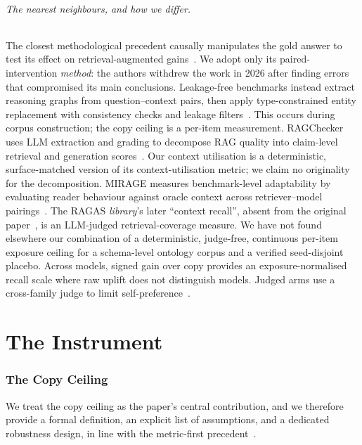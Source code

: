 \documentclass[10pt,twocolumn]{article}
\begin{document}
\paragraph{The nearest neighbours, and how we differ.}
The closest methodological precedent causally manipulates the gold answer to test its effect on retrieval-augmented gains~\cite{answerpresence2026}. We adopt only its paired-intervention \emph{method}: the authors withdrew the work in 2026 after finding errors that compromised its main conclusions. Leakage-free benchmarks instead extract reasoning graphs from question--context pairs, then apply type-constrained entity replacement with consistency checks and leakage filters~\cite{seedrg2026}. This occurs during corpus construction; the copy ceiling is a per-item measurement. RAGChecker uses LLM extraction and grading to decompose RAG quality into claim-level retrieval and generation scores~\cite{ragchecker2024}. Our context utilisation is a deterministic, surface-matched version of its context-utilisation metric; we claim no originality for the decomposition. MIRAGE measures benchmark-level adaptability by evaluating reader behaviour against oracle context across retriever--model pairings~\cite{mirage2025}. The RAGAS \emph{library}'s later ``context recall'', absent from the original paper~\cite{es2023ragas}, is an LLM-judged retrieval-coverage measure. We have not found elsewhere our combination of a deterministic, judge-free, continuous per-item exposure ceiling for a schema-level ontology corpus and a verified seed-disjoint placebo. Across models, signed gain over copy provides an exposure-normalised recall scale where raw uplift does not distinguish models. Judged arms use a cross-family judge to limit self-preference~\cite{zheng2023judging,panickssery2024selfpreference}.



\part{The Instrument}

\section{The Copy Ceiling}\label{sec:ceiling}
We treat the copy ceiling as the paper's central contribution, and we therefore provide a formal definition, an explicit list of assumptions, and a dedicated robustness design, in line with the metric-first precedent~\cite{min2023factscore,gao2023alce}.
\end{document}
